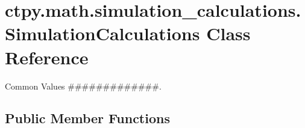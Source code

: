 \hypertarget{classctpy_1_1math_1_1simulation__calculations_1_1_simulation_calculations}{\section{ctpy.\-math.\-simulation\-\_\-calculations.\-Simulation\-Calculations Class Reference}
\label{classctpy_1_1math_1_1simulation__calculations_1_1_simulation_calculations}
}


Common Values \#\#\#\#\#\#\#\#\#\#\#\#\#.  


\subsection*{Public Member Functions}
